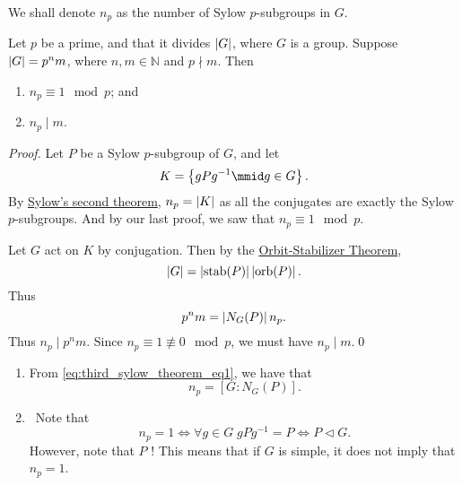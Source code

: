 \documentclass[notoc,notitlepage]{tufte-book}
\DeclareMathOperator{\stab}{stab}
\DeclareMathOperator{\orb}{orb}
\begin{document}
\begin{note}[Notation]
  We shall denote $n_p$ as the number of Sylow $p$-subgroups in $G$.
\end{note}

\begin{thm}\label{thm:third_sylow_theorem}
  Let $p$ be a prime, and that it divides $\left|G\right|$, where $G$ is a group.
  Suppose $\left|G\right| = p^n m$, where $n, m \in \mathbb{N}$ and $p \nmid m$.
  Then
  \begin{enumerate}
    \item $n_p \equiv 1 \mod p$; and
    \item $n_p \mid m$.
  \end{enumerate}
\end{thm}

\begin{proof}
  Let $P$ be a Sylow $p$-subgroup of $G$, and let
  \begin{equation*}
    K = \left\{ gPg^{-1} \mmid g \in G \right\}.
  \end{equation*}
  By \hyperref[thm:second_sylow_theorem]{Sylow's second theorem},
  $n_p = \left|K\right|$ as all the conjugates are exactly the Sylow
  $p$-subgroups. And by our last proof, we saw that $n_p \equiv 1 \mod p$.

  Let $G$ act on $K$ by conjugation. Then by the \hyperref[thm:orbit_stabilizer_theorem]{Orbit-Stabilizer Theorem},
  \begin{equation*}
    \abs{G} = \abs{\stab(P)}\abs{\orb(P)}.
  \end{equation*}
  Thus
  \begin{equation}\label{eq:third_sylow_theorem_eq1}
    p^n m = \left| N_G(P) \right| n_p.
  \end{equation}
  Thus $n_p \mid p^n m$. Since $n_p \equiv 1 \not\equiv 0 \mod p$,
  we must have $n_p \mid m$.\qed\
\end{proof}

\begin{remark}
  \begin{enumerate}
    \item From \cref{eq:third_sylow_theorem_eq1}, we have that
      \begin{equation*}
        n_p = [ G : N_G(P) ].
      \end{equation*}
    \item \imponote\ Note that
      \begin{equation*}
        n_p = 1 \iff \forall g \in G \; gPg^{-1} = P \iff P \triangleleft G.
      \end{equation*}
      However, note that $P$ ! This means that if $G$
      is simple, it does not imply that $n_p = 1$.
  \end{enumerate}
\end{remark}
\end{document}
